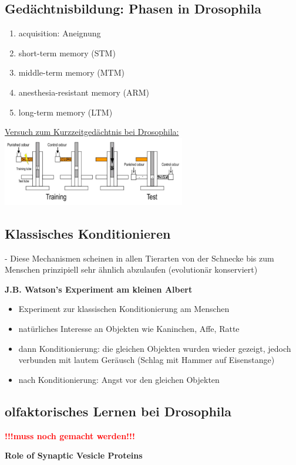 \subsection{Gedächtnisbildung: Phasen in Drosophila}
\begin{enumerate}
	\item acquisition: Aneignung
	\item short-term memory (STM)
	\item middle-term memory (MTM)
	\item anesthesia-resistant memory (ARM)
	\item long-term memory (LTM)
\end{enumerate}

\underline{Versuch zum Kurzzeitgedächtnis bei Drosophila:}\\
\includegraphics[width=0.6\textwidth]{lectures/160615/pix/short_term_memory_drsophila.png}

\subsection{Klassisches Konditionieren}
 - Diese Mechanismen scheinen in allen Tierarten von der Schnecke bis zum Menschen prinzipiell sehr ähnlich abzulaufen (evolutionär konserviert)

\textbf{J.B. Watson's Experiment am kleinen Albert}
\begin{itemize}
	\item Experiment zur klassischen Konditionierung am Menschen
	\item natürliches Interesse an Objekten wie Kaninchen, Affe, Ratte
	\item dann Konditionierung: die gleichen Objekten wurden wieder gezeigt, jedoch verbunden mit lautem Geräusch (Schlag mit Hammer auf Eisenstange)
	\item nach Konditionierung: Angst vor den gleichen Objekten
\end{itemize}

\subsection{olfaktorisches Lernen bei Drosophila}
\textcolor{red}{\textbf{!!!muss noch gemacht werden!!!}}

\textbf{Role of Synaptic Vesicle Proteins}
